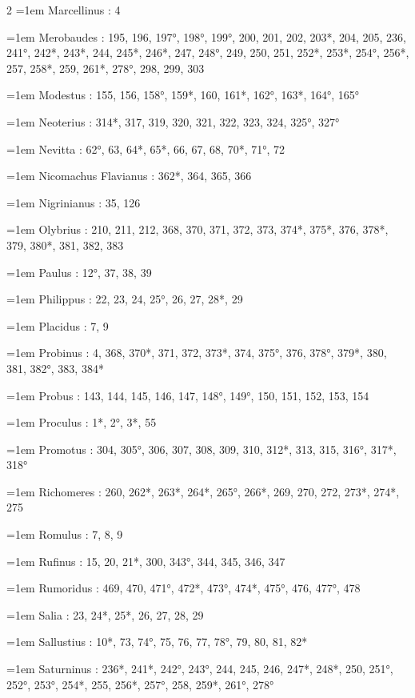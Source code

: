 \begin{multicols}{2}
\hangindent=1em Marcellinus : 4\par
\hangindent=1em Merobaudes : 195, 196, 197°, 198°, 199°, 200, 201, 202, 203*, 204, 205, 236, 241°, 242*, 243*, 244, 245*, 246*, 247, 248°, 249, 250, 251, 252*, 253*, 254°, 256*, 257, 258*, 259, 261*, 278°, 298, 299, 303\par
\hangindent=1em Modestus : 155, 156, 158°, 159*, 160, 161*, 162°, 163*, 164°, 165°\par
\hangindent=1em Neoterius : 314*, 317, 319, 320, 321, 322, 323, 324, 325°, 327°\par
\hangindent=1em Nevitta : 62°, 63, 64*, 65*, 66, 67, 68, 70*, 71°, 72\par
\hangindent=1em Nicomachus Flavianus : 362*, 364, 365, 366\par
\hangindent=1em Nigrinianus : 35, 126\par
\hangindent=1em Olybrius : 210, 211, 212, 368, 370, 371, 372, 373, 374*, 375*, 376, 378*, 379, 380*, 381, 382, 383\par
\hangindent=1em Paulus : 12°, 37, 38, 39\par
\hangindent=1em Philippus : 22, 23, 24, 25°, 26, 27, 28*, 29\par
\hangindent=1em Placidus : 7, 9\par
\hangindent=1em Probinus : 4, 368, 370*, 371, 372, 373*, 374, 375°, 376, 378°, 379*, 380, 381, 382°, 383, 384*\par
\hangindent=1em Probus : 143, 144, 145, 146, 147, 148°, 149°, 150, 151, 152, 153, 154\par
\hangindent=1em Proculus : 1*, 2°, 3*, 55\par
\hangindent=1em Promotus : 304, 305°, 306, 307, 308, 309, 310, 312*, 313, 315, 316°, 317*, 318°\par
\hangindent=1em Richomeres : 260, 262*, 263*, 264*, 265°, 266*, 269, 270, 272, 273*, 274*, 275\par
\hangindent=1em Romulus : 7, 8, 9\par
\hangindent=1em Rufinus : 15, 20, 21*, 300, 343°, 344, 345, 346, 347\par
\hangindent=1em Rumoridus : 469, 470, 471°, 472*, 473°, 474*, 475°, 476, 477°, 478\par
\hangindent=1em Salia : 23, 24*, 25*, 26, 27, 28, 29\par
\hangindent=1em Sallustius : 10*, 73, 74°, 75, 76, 77, 78°, 79, 80, 81, 82*\par
\hangindent=1em Saturninus : 236*, 241*, 242°, 243°, 244, 245, 246, 247*, 248*, 250, 251°, 252°, 253°, 254*, 255, 256*, 257°, 258, 259*, 261°, 278°\par

\end{multicols}
